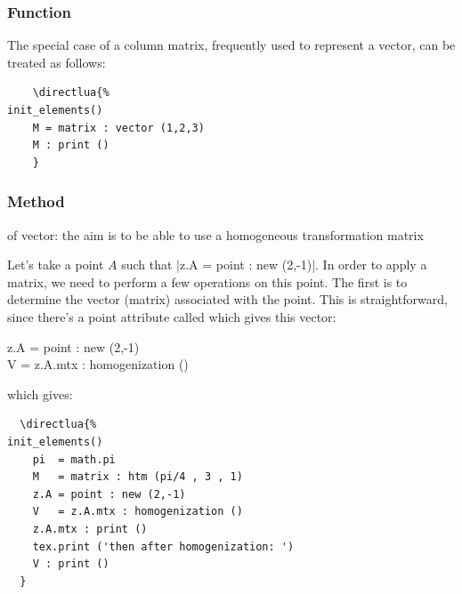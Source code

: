 \subsubsection{Function } %
\label{ssub:method_vector}

The special case of a column matrix, frequently used to represent a vector, can be treated as follows:

\vspace{.5em}
\begin{minipage}{.5\textwidth}
  \begin{Verbatim}
    \directlua{%
init_elements()
    M = matrix : vector (1,2,3)
    M : print () 
    }
  \end{Verbatim}
\end{minipage}
\begin{minipage}{.5\textwidth}
\end{minipage} 

\subsubsection{Method } %
\label{ssub:method_homogenization}

 of vector: the aim is to be able to use a homogeneous transformation matrix

Let's take a point $A$ such that |z.A = point : new (2,-1)|. In order to apply a   matrix, we need to perform a few operations on this point. The first is to determine the vector (matrix) associated with the point. This is straightforward, since there's a point attribute called  which gives this vector:

\begin{mybox}
z.A = point : new (2,-1)\\
V = z.A.mtx : homogenization ()
\end{mybox}
which gives:

\begin{minipage}{.5\textwidth}
  \begin{Verbatim}
  \directlua{%
init_elements()
    pi  = math.pi
    M   = matrix : htm (pi/4 , 3 , 1)
    z.A = point : new (2,-1)
    V   = z.A.mtx : homogenization ()
    z.A.mtx : print () 
    tex.print ('then after homogenization: ')
    V : print ()
  }
  \end{Verbatim}
\end{minipage}
\begin{minipage}{.5\textwidth}
\end{minipage}


